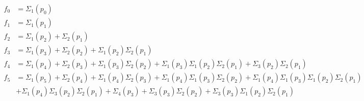 \begin{equation*}
\begin{aligned}
f_0 &=
  \Sigma_1(p_0)
\\
f_1 &=
  \Sigma_1(p_1)
\\
f_2 &=
  \Sigma_1(p_2)
+ \Sigma_2(p_1)
\\
f_3 &=
  \Sigma_1(p_3)
+ \Sigma_2(p_2)
+ \Sigma_1(p_2) \Sigma_2(p_1)
\\
f_4 &=
  \Sigma_1(p_4)
+ \Sigma_2(p_3)
+ \Sigma_1(p_3) \Sigma_2(p_2)
+ \Sigma_1(p_3) \Sigma_1(p_2) \Sigma_2(p_1)
+ \Sigma_3(p_2) \Sigma_2(p_1)
\\
f_5 &=
  \Sigma_1(p_5)
+ \Sigma_2(p_4)
+ \Sigma_1(p_4) \Sigma_2(p_3)
+ \Sigma_1(p_4) \Sigma_1(p_3) \Sigma_2(p_2)
+ \Sigma_1(p_4) \Sigma_1(p_3) \Sigma_1(p_2) \Sigma_2(p_1) \\
&
+ \Sigma_1(p_4) \Sigma_3(p_2) \Sigma_2(p_1)
+ \Sigma_4(p_3)
+ \Sigma_3(p_3) \Sigma_2(p_2)
+ \Sigma_3(p_3) \Sigma_1(p_2) \Sigma_2(p_1)
\end{aligned}
\end{equation*}